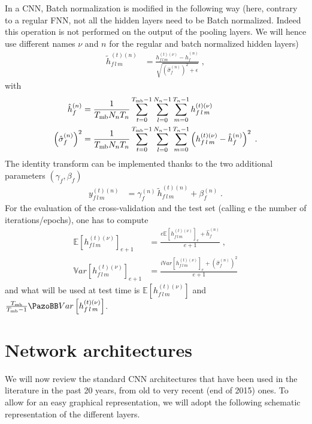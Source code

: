 In a CNN, Batch normalization is modified in the following way (here, contrary to a regular FNN, not all the hidden layers need to be Batch normalized. Indeed this operation is not performed on the output of the pooling layers. We will hence use different names $\nu$ and $n$ for the regular and batch normalized hidden layers)
\begin{align}
\tilde{h}_{f\,l\,m}^{(t)(n)}&=\frac{h_{f\,l\,m}^{(t)(\nu)}-\hat{h}_{f}^{(n)}}
%
{\sqrt{\left(\hat{\sigma}_{f}^{(n)}\right)^2+\epsilon}}\;,
\end{align}
with
\begin{align}
\hat{h}_{f}^{(n)}&=
%
\frac{1}{T_{{\rm mb}}N_nT_n}\sum^{T_{{\rm mb}}-1}_{t=0}\sum^{N_n-1}_{l=0}\sum^{T_n-1}_{m=0}h_{f\,l\,m}^{(t)(\nu)}\\
%
\left(\hat{\sigma}_{f}^{(n)}\right)^2&=\frac{1}{T_{{\rm mb}}N_nT_n}\sum^{T_{{\rm mb}}-1}_{t=0}
%
\sum^{N_n-1}_{l=0}\sum^{T_n-1}_{m=0}\left(h_{f\,l\,m}^{(t)(\nu)}-\hat{h}_{f}^{(n)}\right)^2\;.
\end{align}
The identity transform can be implemented thanks to the two additional parameters $(\gamma_f,\beta_f)$
\begin{align}
y^{(t)(n)}_{f\,l\,m}&=\gamma^{(n)}_f\,\tilde{h}_{f\,l\,m}^{(t)(n)}+\beta^{(n)}_f\;.
\end{align}
For the evaluation of the cross-validation and the test set (calling e the number of iterations/epochs), one has to compute
\begin{align}
\mathbb{E}\left[h_{f\,l\,m}^{(t)(\nu)}\right]_{e+1} &=
%
\frac{e\mathbb{E}\left[h_{f\,l\,m}^{(t)(\nu)}\right]_{e}+\hat{h}_{f}^{(n)}}{e+1}\;,\\
%
\mathbb{V}ar\left[h_{f\,l\,m}^{(t)(\nu)}\right]_{e+1} &=
%
\frac{i\mathbb{V}ar\left[h_{f\,l\,m}^{(t)(\nu)}\right]_{e}+\left(\hat{\sigma}_{f}^{(n)}\right)^2}{e+1}
\end{align}
and what will be used at test time is $\mathbb{E}\left[h_{f\,l\,m}^{(t)(\nu)}\right]$ and $\frac{T_{{\rm mb}}}{T_{{\rm mb}}-1}\mathbb{V}ar\left[h_{f\,l\,m}^{(t)(\nu)}\right]$.


\section{Network architectures}

We will now review the standard CNN architectures that have been used in the literature in the past 20 years, from old to very recent (end of 2015) ones. To allow for an easy graphical representation, we will adopt the following schematic representation of the different layers.

